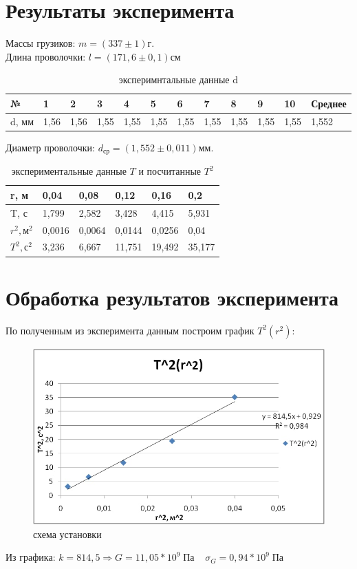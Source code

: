 \documentclass[a4paper,14pt]{extarticle}
\begin{document}
	\section{Результаты эксперимента}
	Массы грузиков: $m = (337\pm 1)$г.
	\\Длина проволочки: $l = (171,6 \pm 0,1)$см
	\begin{table}[H]
		\centering
		\begin{tabular}{|l|l|l|l|l|l|l|l|l|l|l|l|}
			\hline
			№ & 1 & 2 & 3 & 4 & 5 & 6 & 7 & 8 & 9 & 10 & Среднее \\ \hline
			d, мм & 1,56 & 1,56 & 1,55 & 1,55 & 1,55 & 1,55 & 1,55 & 1,55 & 1,55 & 1,55 & 1,552 \\ \hline
		\end{tabular}
	\caption{эксперимнтальные данные d}
	\end{table}
	Диаметр проволочки: $d_\text{ср} = (1,552 \pm 0,011)$мм.
	\begin{table}[!ht]
		\centering
		\begin{tabular}{|l|l|l|l|l|l|}
			\hline
			r, м & 0,04 & 0,08 & 0,12 & 0,16 & 0,2 \\ \hline
			T, с & 1,799 & 2,582 & 3,428 & 4,415 & 5,931 \\ \hline
			$r^2, \text{м}^2$ & 0,0016 & 0,0064 & 0,0144 & 0,0256 & 0,04 \\ \hline
			$T^2, \text{с}^2$ & 3,236 & 6,667 & 11,751 & 19,492 & 35,177 \\ \hline
		\end{tabular}
	\caption{экспериментальные данные $T$ и посчитанные $T^2$}
	\end{table}
	\section{Обработка результатов эксперимента}
	По полученным из эксперимента данным построим график $T^2(r^2)$:
	\begin{figure}[H]
		\begin{center}
			\includegraphics[scale = 0.9]{"1.3.2_5.jpg"}
			\caption{схема установки}
		\end{center}
	\end{figure}
	Из графика:  $k = 814,5 \Rightarrow G = 11,05*10^9 \;\text{Па} \;\;\;\;\sigma_G = 0,94 * 10^9 \;\text{Па} $
\end{document}

